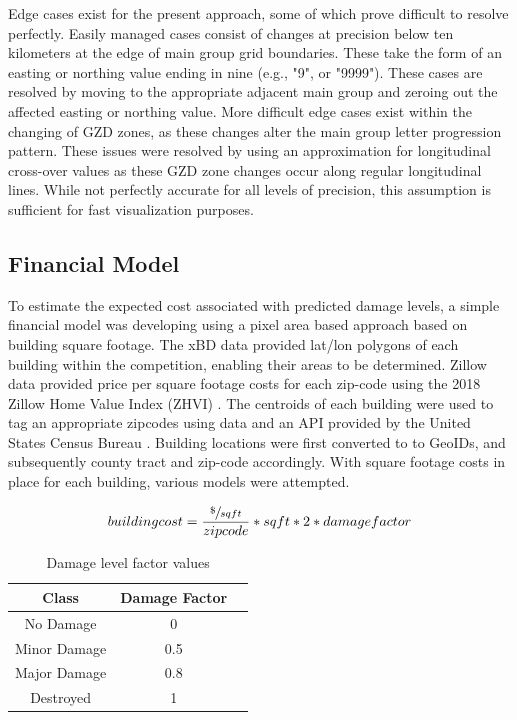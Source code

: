 \documentclass[conference]{IEEEtran}
\begin{document}
Edge cases exist for the present approach, some of which prove difficult to resolve perfectly. Easily managed cases consist of changes at precision below ten kilometers at the edge of main group grid boundaries. These take the form of an easting or northing value ending in nine (e.g., "9", or "9999"). These cases are resolved by moving to the appropriate adjacent main group and zeroing out the affected easting or northing value. More difficult edge cases exist within the changing of GZD zones, as these changes alter the main group letter progression pattern. These issues were resolved by using an approximation for longitudinal cross-over values as these GZD zone changes occur along regular longitudinal lines. While not perfectly accurate for all levels of precision, this assumption is sufficient for fast visualization purposes.

\subsection{Financial Model}
To estimate the expected cost associated with predicted damage levels, a simple financial model was developing using a pixel area based approach based on building square footage. The xBD data provided lat/lon polygons of each building within the competition, enabling their areas to be determined. Zillow data provided price per square footage costs for each zip-code using the 2018 Zillow Home Value Index (ZHVI) \cite{a14}. The centroids of each building were used to tag an appropriate zipcodes using data and an API provided by the United States Census Bureau \cite{a15}. Building locations were first converted to to GeoIDs, and subsequently county tract and zip-code accordingly. With square footage costs in place for each building, various models were attempted. 

\begin{equation}
building cost = \frac{\sfrac{\text{\$}}{sqft}}{zipcode} * sqft * 2 * damagefactor \label{eq1}
\end{equation}

\begin{table}[ht!]
\begin{center}
\begin{tabular}{||c|c|c||}
\hline
\textbf{Class} & \textbf{Damage Factor} \\
\hline\hline
 No Damage & 0  \\ 
 Minor Damage & 0.5 \\
 Major Damage & 0.8 \\
 Destroyed & 1 \\
\hline
\end{tabular}
\end{center}
\caption{Damage level factor values}
\label{damagefactors}
\end{table}
\end{document}
